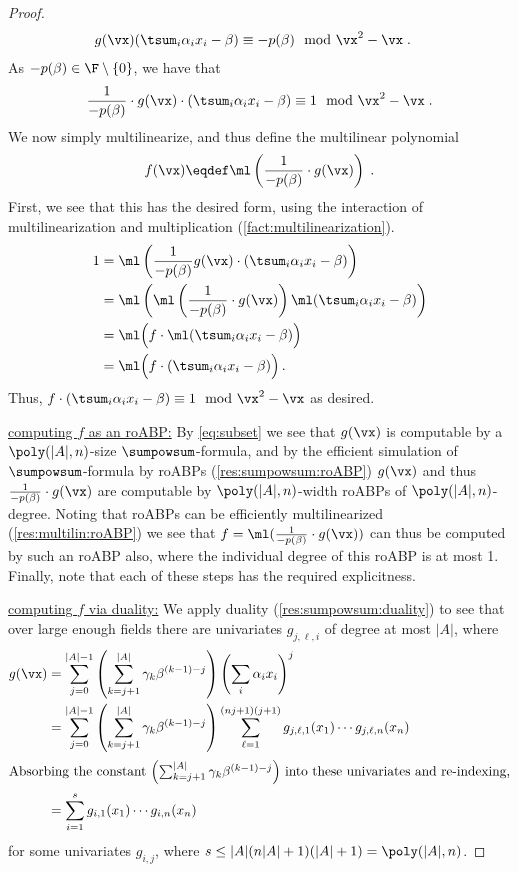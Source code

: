 \documentclass[11pt]{article}
\numberwithin{equation}{section}
\theoremstyle{definition}
\theoremstyle{plain}
\begin{document}
\begin{proof}
        \begin{align*}
                g(\vx) (\tsum_i \alpha_ix_i-\beta)
                &\equiv -p(\beta)\mod\vx^2-\vx
                \;.
        \end{align*}
        As $-p(\beta)\in\F\setminus\{0\}$, we have that
        \[
                \frac{1}{-p(\beta)}\cdot g(\vx) \cdot \left(\tsum_i \alpha_ix_i-\beta\right)\equiv 1 \mod \vx^2-\vx
                \;.
        \]
        We now simply multilinearize, and thus define the multilinear polynomial
        \[
                f(\vx)\eqdef \ml\left(\frac{1}{-p(\beta)}\cdot g(\vx)\right)
                \;.
        \]
        First, we see that this has the desired form, using the interaction of multilinearization and multiplication (\autoref{fact:multilinearization}).
        \begin{align*}
                1
                &=\ml\left(\frac{1}{-p(\beta)} g(\vx) \cdot (\tsum_i \alpha_ix_i-\beta)\right)\\
                &=\ml\left(\ml\left(\frac{1}{-p(\beta)}\cdot g(\vx)\right)\ml(\tsum_i \alpha_ix_i-\beta)\right)\\
                &=\ml\Big(f \cdot \ml(\tsum_i \alpha_ix_i-\beta)\Big)\\
                &=\ml\Big(f\cdot (\tsum_i \alpha_ix_i-\beta)\Big)\,.
        \end{align*}
        Thus, $f\cdot (\tsum_i \alpha_ix_i-\beta)\equiv 1\mod\vx^2-\vx$ as desired.

        \uline{computing $f$ as an roABP:}  By \autoref{eq:subset} we see that $g(\vx)$ is computable by a $\poly(|A|,n)$-size $\sumpowsum$-formula, and by the efficient simulation of $\sumpowsum$-formula by roABPs (\autoref{res:sumpowsum:roABP}) $g(\vx)$ and thus $\frac{1}{-p(\beta)}\cdot g(\vx)$ are computable by $\poly(|A|,n)$-width roABPs of $\poly(|A|,n)$-degree. Noting that roABPs can be efficiently multilinearized (\autoref{res:multilin:roABP}) we see that $f=\ml(\frac{1}{-p(\beta)}\cdot g(\vx))$ can thus be computed by such an roABP also, where the individual degree of this roABP is at most 1. Finally, note that each of these steps has the required explicitness.

        \uline{computing $f$ via duality:} We apply duality (\autoref{res:sumpowsum:duality}) to see that over large enough fields there are univariates $g_{j,\ell,i}$ of degree at most $|A|$, where
        \begin{align*}
                g(\vx)
                &=\sum_{j=0}^{|A|-1}\left(\sum_{k=j+1}^{|A|} \gamma_k\beta^{(k-1)-j} \right) \left(\sum_i \alpha_i x_i\right)^j\\
                &=\sum_{j=0}^{|A|-1}\left(\sum_{k=j+1}^{|A|} \gamma_k\beta^{(k-1)-j} \right) \sum_{\ell=1}^{(nj+1)(j+1)}g_{j,\ell,1}(x_1)\cdots g_{j,\ell,n}(x_n)\,\\
                \intertext{Absorbing the constant $\left(\sum_{k=j+1}^{|A|} \gamma_k\beta^{(k-1)-j} \right)$ into these univariates and re-indexing,}
                &=\sum_{i=1}^{s} g_{i,1}(x_1)\cdots g_{i,n}(x_n)
        \end{align*}
        for some univariates $g_{i,j}$, where $s\le |A|(n|A|+1)(|A|+1)=\poly(|A|,n)$.


\end{proof}
\end{document}
